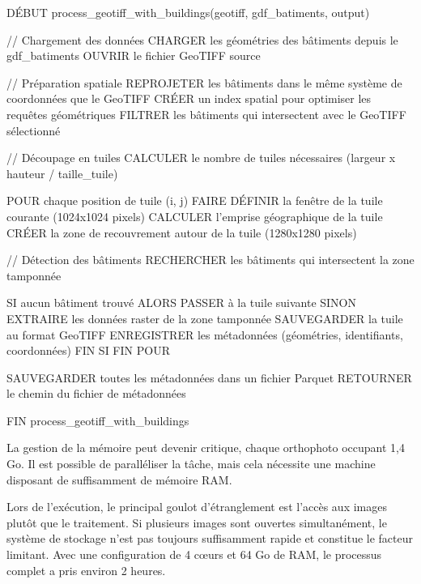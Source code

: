 \begin{code}[H]
    \begin{textcode}
    DÉBUT process_geotiff_with_buildings(geotiff, gdf_batiments, output)
        
        // Chargement des données
        CHARGER les géométries des bâtiments depuis le gdf_batiments
        OUVRIR le fichier GeoTIFF source
        
        // Préparation spatiale
        REPROJETER les bâtiments dans le même système de coordonnées que le GeoTIFF
        CRÉER un index spatial pour optimiser les requêtes géométriques
        FILTRER les bâtiments qui intersectent avec le GeoTIFF sélectionné
        
        // Découpage en tuiles
        CALCULER le nombre de tuiles nécessaires (largeur x hauteur / taille_tuile)
        
        POUR chaque position de tuile (i, j) FAIRE
            DÉFINIR la fenêtre de la tuile courante (1024x1024 pixels)
            CALCULER l'emprise géographique de la tuile
            CRÉER la zone de recouvrement autour de la tuile (1280x1280 pixels)
            
            // Détection des bâtiments
            RECHERCHER les bâtiments qui intersectent la zone tamponnée
            
            SI aucun bâtiment trouvé ALORS
                PASSER à la tuile suivante
            SINON
                EXTRAIRE les données raster de la zone tamponnée
                SAUVEGARDER la tuile au format GeoTIFF
                ENREGISTRER les métadonnées (géométries, identifiants, coordonnées)
            FIN SI
        FIN POUR
        
        SAUVEGARDER toutes les métadonnées dans un fichier Parquet
        RETOURNER le chemin du fichier de métadonnées
        
    FIN process_geotiff_with_buildings
    \end{textcode}
    \label{code:pseudo_code_decoupe_orthophotos_tuiles_1280_1280}
\end{code}

La gestion de la mémoire peut devenir critique, chaque orthophoto occupant 1,4 Go. Il est possible de paralléliser la tâche, mais cela nécessite une machine disposant de suffisamment de mémoire RAM. 

Lors de l'exécution, le principal goulot d'étranglement est l'accès aux images plutôt que le traitement. Si plusieurs images sont ouvertes simultanément, le système de stockage n'est pas toujours suffisamment rapide et constitue le facteur limitant. Avec une configuration de 4 cœurs et 64 Go de RAM, le processus complet a pris environ 2 heures.


